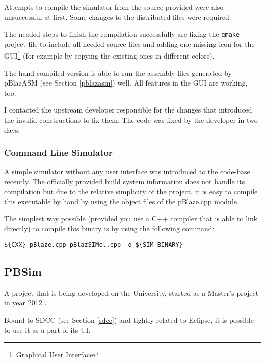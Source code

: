             Attempts to compile the simulator from the source provided were also unsuccessful at first. Some changes to the distributed files were required.

            The needed steps to finish the compilation successfully are fixing the \texttt{qmake} project file to include all needed source files and adding one missing icon for the GUI\footnote{Graphical User Interface} (for example by copying the existing ones in different colors).

            The hand-compiled version is able to run the assembly files generated by pBlazASM (see Section \ref{pblazasm}) well. All features in the GUI are working, too.

            I contacted the upstream developer responsible for the changes that introduced the invalid constructions to fix them. The code was fixed by the developer in two days.

            \subsubsection{Command Line Simulator}

            A simple simulator without any user interface was introduced to the code-base recently. The officially provided build system information does not handle its compilation but due to the relative simplicity of the project, it is easy to compile this executable by hand by using the object files of the pBlaze.cpp module.

            The simplest way possible (provided you use a C++ compiler that is able to link directly) to compile this binary is by using the following command:

            \begin{center}
                \texttt{\$\{CXX\} pBlaze.cpp pBlazSIMcl.cpp -o \$\{SIM\_BINARY\}}
            \end{center}

        \subsection{PBSim}\label{pbsim}

        A project that is being developed on the University, started as a Master's project in year 2012 \cite{PbsimProj}.

        Bound to SDCC (see Section \ref{sdcc}) and tightly related to Eclipse, it is possible to use it as a part of its UI.

